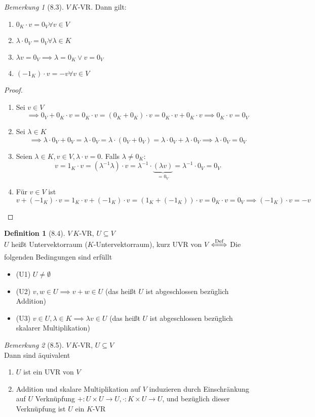 \documentclass[a4paper]{scrartcl}
\DeclareMathOperator{\Forall}{\forall}
\theoremstyle{definition}
\newtheorem{defn}{Definition}
\theoremstyle{plain}
\theoremstyle{plain}
\theoremstyle{remark}
\newtheorem{remark}{Bemerkung}
\theoremstyle{remark}
\theoremstyle{remark}
\theoremstyle{remark}
\theoremstyle{remark}
\begin{document}
\begin{remark}[8.3]
$V~K$-VR. Dann gilt:
\begin{enumerate}
\item $0_K \cdot v = 0_V \Forall v\in V$
\item $\lambda \cdot 0_V = 0_V \Forall \lambda\in K$
\item $\lambda v = 0_V \implies \lambda = 0_K \vee v = 0_V$
\item $(-1_K)\cdot v = -v \Forall v\in V$
\end{enumerate}
\end{remark}
\begin{proof}
\begin{enumerate}
\item Sei $v \in V$
         \[\implies 0_V + 0_K \cdot v = 0_K \cdot v = (0_K + 0_K)\cdot v = 0_K\cdot v + 0_K \cdot v \implies 0_K \cdot v = 0_V\]
\item Sei $\lambda \in K$
         \[\implies \lambda \cdot 0_V + 0_V = \lambda \cdot 0_V = \lambda \cdot (0_V + 0_V) = \lambda\cdot 0_V + \lambda \cdot 0_V \implies \lambda \cdot 0_V = 0_V\]
\item Seien $\lambda \in K, v\in V, \lambda\cdot v = 0$. Falls $\lambda \neq 0_K:$
         \[v = 1_K \cdot v = (\lambda^{-1} \lambda)\cdot v = \lambda^{-1}\cdot \underbrace{(\lambda v)}_{= 0_V} = \lambda^{-1} \cdot 0_V = 0_V\]
\item Für $v\in V$ ist
\[v + (-1_K) \cdot v = 1_K \cdot v + (-1_K)\cdot v = (1_K + (-1_K))\cdot v = 0_K \cdot v = 0_V \implies (-1_K)\cdot v = -v\]
\end{enumerate}
\end{proof}
\begin{defn}[8.4]
$V~K$-VR, $U\subseteq V$ \\
  $U$ heißt Untervektorraum ($K$-Untervektorraum), kurz UVR von $V$ $\xLeftrightarrow{\text{Def}}$ Die folgenden Bedingungen sind erfüllt
\begin{itemize}
\item (U1) $U\neq \emptyset$
\item (U2) $v,w \in U \implies v + w \in U$ \hfill (das heißt $U$ ist abgeschlossen bezüglich Addition)
\item (U3) $v\in U, \lambda \in K \implies \lambda v \in U$ \hfill (das heißt $U$ ist abgeschlossen bezüglich skalarer Multiplikation)
\end{itemize}
\end{defn}
\begin{remark}[8.5]
$V~K$-VR, $U\subseteq V$ \\
  Dann sind äquivalent
\begin{enumerate}
\item $U$ ist ein UVR von $V$
\item Addition und skalare Multiplikation auf $V$ induzieren durch Einschränkung auf $U$ Verknüpfung $+: U\times U\to U, \cdot:K\times U \to U$, und bezüglich dieser Verknüpfung ist $U$ ein $K$-VR
\end{enumerate}
\end{remark}
\end{document}
